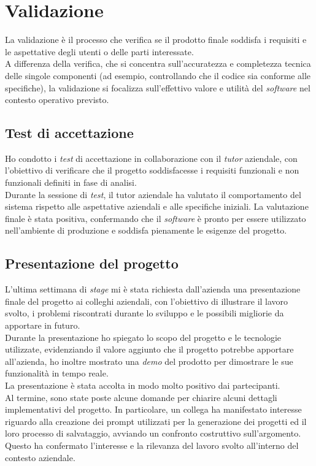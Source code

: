 \pagebreak
\section{Validazione}
\label{sez:validazione}

La validazione è il processo che verifica se il prodotto finale soddisfa i requisiti e le aspettative degli utenti o delle parti interessate. \\
A differenza della verifica, che si concentra sull’accuratezza e completezza tecnica delle singole componenti (ad esempio, controllando che il codice sia conforme alle specifiche), la validazione si focalizza sull’effettivo valore e utilità del \textit{software} nel contesto operativo previsto.  \\

\subsection{Test di accettazione}
\label{subsec:test-accettazione}

Ho condotto i \textit{test} di accettazione in collaborazione con il \textit{tutor} aziendale, con l’obiettivo di verificare che il progetto soddisfacesse i requisiti funzionali e non funzionali definiti in fase di analisi.\\

\noindent Durante la sessione di \textit{test}, il tutor aziendale ha valutato il comportamento del sistema rispetto alle aspettative aziendali e alle specifiche iniziali. La valutazione finale è stata positiva, confermando che il \textit{software} è pronto per essere utilizzato nell’ambiente di produzione e soddisfa pienamente le esigenze del progetto.
\subsection{Presentazione del progetto}
\label{subsec:presentazione-progetto}

L'ultima settimana di \textit{stage} mi è stata richiesta dall'azienda una presentazione finale del progetto ai colleghi aziendali, con l'obiettivo di illustrare il lavoro svolto, i problemi riscontrati durante lo sviluppo e le possibili migliorie da apportare in futuro.\\

\noindent Durante la presentazione ho spiegato lo scopo del progetto e le tecnologie utilizzate, evidenziando il valore aggiunto che il progetto potrebbe apportare all'azienda, ho inoltre mostrato una \textit{demo} del prodotto per dimostrare le sue funzionalità in tempo reale.\\  

\noindent La presentazione è stata accolta in modo molto positivo dai partecipanti. \\Al termine, sono state poste alcune domande per chiarire alcuni dettagli implementativi del progetto. In particolare, un collega ha manifestato interesse riguardo alla creazione dei \gls{prompt} utilizzati per la generazione dei progetti ed il loro processo di salvataggio, avviando un confronto costruttivo sull’argomento.\\
Questo ha confermato l’interesse e la rilevanza del lavoro svolto all'interno del contesto aziendale.

